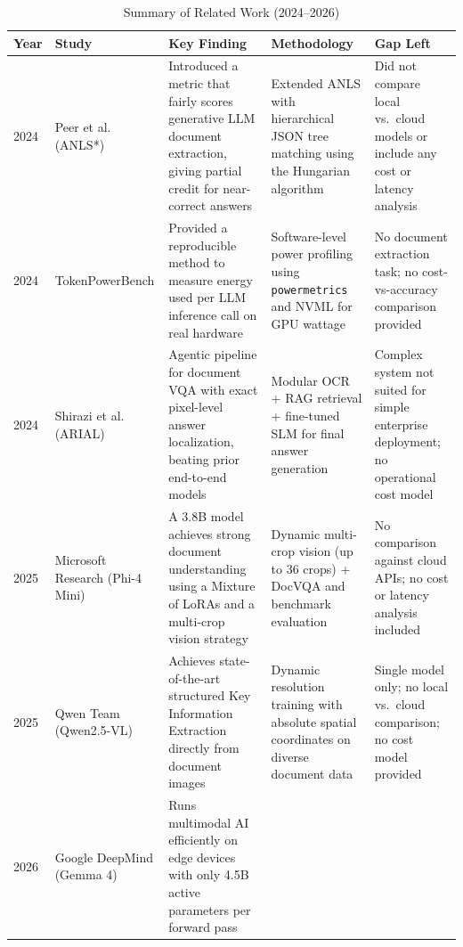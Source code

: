 \begin{table}[h!]
\centering
\small
\caption{Summary of Related Work (2024--2026)}
\label{tab:related-work}
\begin{tabular}{|p{0.7cm}|p{2.5cm}|p{3.7cm}|p{3.2cm}|p{3.7cm}|}
\hline
\textbf{Year} & \textbf{Study} & \textbf{Key Finding} & \textbf{Methodology} & \textbf{Gap Left} \\
\hline
2024 &
Peer et al.\ \cite{anlsstar_2024} \newline (ANLS*) &
Introduced a metric that fairly scores generative LLM document extraction, giving partial credit for near-correct answers &
Extended ANLS with hierarchical JSON tree matching using the Hungarian algorithm &
Did not compare local vs.\ cloud models or include any cost or latency analysis \\
\hline
2024 &
TokenPowerBench \cite{tokenpowerbench_2024} &
Provided a reproducible method to measure energy used per LLM inference call on real hardware &
Software-level power profiling using \texttt{powermetrics} and NVML for GPU wattage &
No document extraction task; no cost-vs-accuracy comparison provided \\
\hline
2024 &
Shirazi et al.\ \cite{arial_2024} \newline (ARIAL) &
Agentic pipeline for document VQA with exact pixel-level answer localization, beating prior end-to-end models &
Modular OCR + RAG retrieval + fine-tuned SLM for final answer generation &
Complex system not suited for simple enterprise deployment; no operational cost model \\
\hline
2025 &
Microsoft Research \cite{phi4mini_2025} \newline (Phi-4 Mini) &
A 3.8B model achieves strong document understanding using a Mixture of LoRAs and a multi-crop vision strategy &
Dynamic multi-crop vision (up to 36 crops) + DocVQA and benchmark evaluation &
No comparison against cloud APIs; no cost or latency analysis included \\
\hline
2025 &
Qwen Team \cite{qwen25vl_2025} \newline (Qwen2.5-VL) &
Achieves state-of-the-art structured Key Information Extraction directly from document images &
Dynamic resolution training with absolute spatial coordinates on diverse document data &
Single model only; no local vs.\ cloud comparison; no cost model provided \\
\hline
2026 &
Google DeepMind \cite{gemma4_2026} \newline (Gemma 4) &
Runs multimodal AI efficiently on edge devices with only 4.5B active parameters per forward pass &

\end{tabular}
\end{table}
